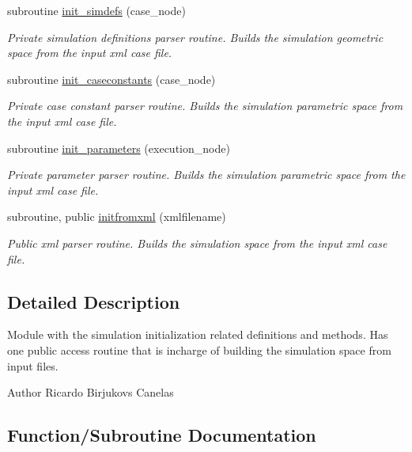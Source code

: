 \begin{DoxyCompactItemize}
subroutine \mbox{\hyperlink{namespaceinitialize__mod_a18736cca205403067232125b8e510ab2}{init\+\_\+simdefs}} (case\+\_\+node)
\begin{DoxyCompactList}\small\item\em Private simulation definitions parser routine. Builds the simulation geometric space from the input xml case file. \end{DoxyCompactList}\item 
subroutine \mbox{\hyperlink{namespaceinitialize__mod_a9d19665b9ac12c3db8b0842bfdb6fa0c}{init\+\_\+caseconstants}} (case\+\_\+node)
\begin{DoxyCompactList}\small\item\em Private case constant parser routine. Builds the simulation parametric space from the input xml case file. \end{DoxyCompactList}\item 
subroutine \mbox{\hyperlink{namespaceinitialize__mod_aac9d9dabb797c83e360f9ae60a7e65e3}{init\+\_\+parameters}} (execution\+\_\+node)
\begin{DoxyCompactList}\small\item\em Private parameter parser routine. Builds the simulation parametric space from the input xml case file. \end{DoxyCompactList}\item 
subroutine, public \mbox{\hyperlink{namespaceinitialize__mod_a107012ffec69fe2d7c524d240193439e}{initfromxml}} (xmlfilename)
\begin{DoxyCompactList}\small\item\em Public xml parser routine. Builds the simulation space from the input xml case file. \end{DoxyCompactList}\end{DoxyCompactItemize}


\subsection{Detailed Description}
Module with the simulation initialization related definitions and methods. Has one public access routine that is incharge of building the simulation space from input files. 

\begin{DoxyAuthor}{Author}
Ricardo Birjukovs Canelas 
\end{DoxyAuthor}


\subsection{Function/\+Subroutine Documentation}
\mbox{\label{namespaceinitialize__mod_a9d19665b9ac12c3db8b0842bfdb6fa0c}} 
